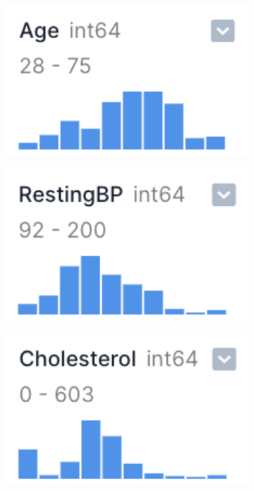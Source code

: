 \begin{figure}[H]
    \centering
    \begin{subfigure}{0.19\columnwidth}
        \includegraphics[width=1\textwidth]{images/feat_age.png}
    \end{subfigure}
    \begin{subfigure}{0.19\columnwidth}
        \includegraphics[width=1\textwidth]{images/feat_restingbp.png}
    \end{subfigure}
    \begin{subfigure}{0.19\columnwidth}
        \includegraphics[width=1\textwidth]{images/feat_cholesterol.png}

\end{subfigure}
\end{figure}
